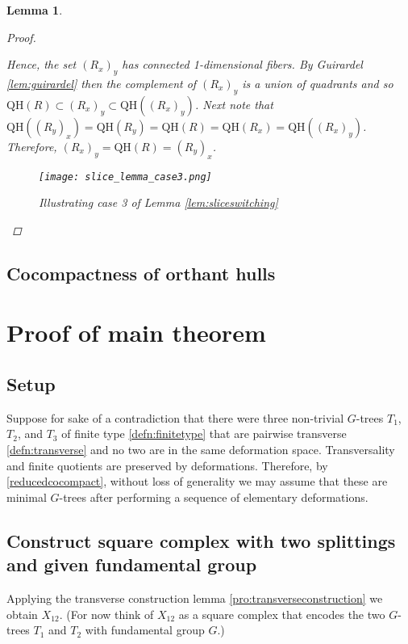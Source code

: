 \documentclass[12pt,parskip=full]{report}
\theoremstyle{plain}
\newtheorem{lem}[thm]{Lemma}
\theoremstyle{definition}
\newcommand{\rxy}{(R_x)_y}
\newcommand{\ryx}{(R_y)_x}
\begin{document}
\begin{lem}
\begin{proof}
\begin{enumerate}
        \end{enumerate}
        Hence, the set $\rxy$ has connected 1-dimensional fibers. By Guirardel \ref{lem:guirardel} then the complement of $\rxy$ is a union of quadrants and so $\text{QH}(R)\subset \rxy\subset \text{QH}(\rxy)$. Next note that $\text{QH}((R_y)_x)=\text{QH}(R_y)=\text{QH}(R)=\text{QH}(R_x)=\text{QH}((R_x)_y)$. Therefore, $\rxy =\text{QH}(R)=\ryx$.
        
        
        
        \begin{figure}[htp]
    \centering
    \texttt{[image: slice\_lemma\_case3.png]}
    \caption{Illustrating case 3 of Lemma \ref{lem:sliceswitching}}
    \label{fig:square}
\end{figure}
        
        
        
                  
    \end{proof}
\end{lem}

\section{Cocompactness of orthant hulls}
\chapter{Proof of main theorem}

\section{Setup}

Suppose for sake of a contradiction that there were three non-trivial \(G\)-trees \(T_{1}\), \(T_{2}\), and \(T_{3}\) of finite type \ref{defn:finitetype} that are pairwise transverse \ref{defn:transverse} and no two are in the same deformation space. Transversality and finite quotients are preserved by deformations. Therefore, by \ref{reducedcocompact}, without loss of generality we may assume that these are minimal \(G\)-trees after performing a sequence of elementary deformations. 

\section{Construct square complex with two splittings and given fundamental group}

Applying the transverse construction lemma \ref{pro:transverseconstruction} we obtain \(X_{12}\). (For now think of $X_{12}$ as a square complex that encodes the two $G$-trees $T_1$ and $T_2$ with fundamental group $G$.) 
\end{document}
